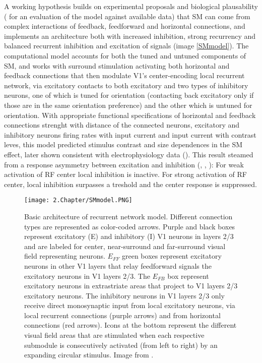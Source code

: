 A working hypothesis \cite{Schwabe2006} builds on experimental proposals and biological plausability (\cite{Angelucci2017} for an evaluation of the model against available data) that SM can come from complex interactions of feedback, feedforward and horizontal connections, and implements an architecture both with increased inhibition, strong recurrency and balanced recurrent inhibition and excitation of signals (image \ref{SMmodel}). The computational model accounts for both the tuned and untuned components of SM, and works with surround stimulation activating both horizontal and feedback connections that then modulate V1's center-encoding local recurrent network, via excitatory contacts to both excitatory and two types of inhibitory neurons, one of which is tuned for orientation (contacting back excitatory only if those are in the same orientation preference) and the other which is untuned for orientation. With appropriate functional specifications of horizontal and feedback connections strenght with distance of the connected neurons, excitatory and inhibitory neurons firing rates with input current and input current with contrast leves, this model predicted stimulus contrast and size dependences in the SM effect, later shown consistent with electrophysiology data (\cite{Schwabe2010}). This result steamed from a response asymmetry between excitation and inhibition (\cite{Somers1998}, \cite{Dragoi2000}, \cite{Schwabe2006}): For weak activation of RF center local inhibition is inactive. For strong activation of RF center, local inhibition surpasses a treshold and the center response is suppressed. 

\begin{figure}[H]
\center
\texttt{[image: 2.Chapter/SMmodel.PNG]}
\caption{Basic architecture of \cite{Schwabe2006} recurrent network model. Different connection types are represented as color-coded arrows. Purple and black boxes represent excitatory (E) and inhibitory (I) V1 neurons in layers 2/3 and are labeled for center, near-surround and far-surround visual field representing neurons. $E_{FF}$ green boxes represent excitatory neurons in other V1 layers that relay feedforward signals the excitatory neurons in V1 layers 2/3. The $E_{FB}$ box represent excitatory neurons in extrastriate areas that project to V1 layers 2/3 excitatory neurons. The inhibitory neurons in V1 layers 2/3 only receive direct monosynaptic input from local excitatory neurons, via local recurrent connections (purple arrows) and from horizontal connections (red arrows). 
Icons at the bottom represent the different visual field areas that are stimulated when each respective submodule is consecutively activated (from left to right) by an expanding circular stimulus.
\newline \newline \tiny{Image from \cite{Schwabe2006}.}}
\label{samondsnonun}
\end{figure}


